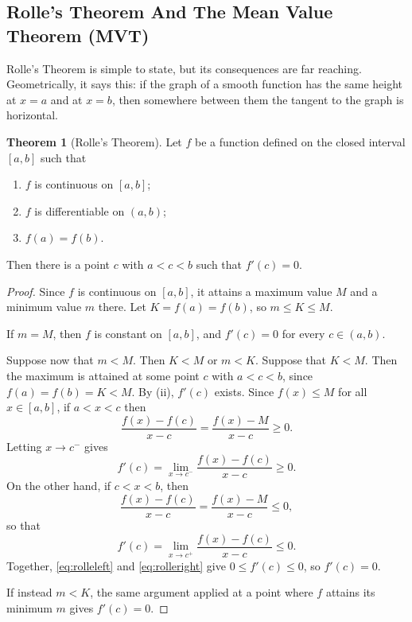 \documentclass[11pt,a4paper]{article}
\numberwithin{equation}{section}
\theoremstyle{definition}
\newtheorem{thm}{Theorem}[subsection]
\begin{document}
\subsection{Rolle's Theorem And The Mean Value Theorem (MVT)}\label{sec:mvt}

Rolle's Theorem is simple to state, but its consequences are far reaching. Geometrically, it says this: if the graph of a smooth function has the same height at $x=a$ and at $x = b$, then somewhere between them the tangent to the graph is horizontal.


\begin{thm}[Rolle's Theorem]
Let $f$ be a function defined on the closed interval $[a,b]$ such that
\begin{enumerate}
\item[(i)] $f$ is continuous on $[a,b]$;
\item[(ii)] $f$ is differentiable on $(a,b)$;
\item[(iii)] $f(a) = f(b)$.
\end{enumerate}
Then there is a point $c$ with $a< c< b$ such that $f'(c) = 0$.
\end{thm}

\begin{proof}
Since $f$ is continuous on $[a,b]$, it attains a maximum value $M$ and a minimum value $m$ there. Let $K = f(a) = f(b)$, so $m \leq K \leq M$.

If $m = M$, then $f$ is constant on $[a,b]$, and $f'(c) = 0$ for every $c\in(a,b)$.

Suppose now that $m < M$. Then $K < M$ or $m < K$. Suppose that $K < M$. Then the maximum is attained at some point $c$ with $a< c < b$, since $f(a) = f(b) = K<M$. By (ii), $f'(c)$ exists. Since $f(x) \leq M$ for all $x\in [a,b]$, if $a< x < c$ then
$$\frac{f(x) - f(c)}{x - c} = \frac{f(x) - M}{x - c}\geq 0 .$$
Letting $x \rightarrow c^-$ gives
\begin{equation}\label{eq:rolleleft}
f'(c) = \lim_{x \rightarrow c^-} \frac{f(x) - f(c)}{x - c} \geq 0 .
\end{equation}
On the other hand, if $c < x < b$, then
$$\frac{f(x) - f(c)}{x - c} = \frac{f(x) - M}{x - c}\leq 0,$$
so that
\begin{equation}\label{eq:rolleright}
f'(c) = \lim_{x \rightarrow c^+} \frac{f(x) - f(c)}{x - c} \leq 0 .
\end{equation}
Together, \eqref{eq:rolleleft} and \eqref{eq:rolleright} give $0\leq  f'(c)\leq 0$, so $f'(c) = 0$.

If instead $m< K$, the same argument applied at a point where $f$ attains its minimum $m$ gives $f'(c) = 0$.
\end{proof}
\end{document}
